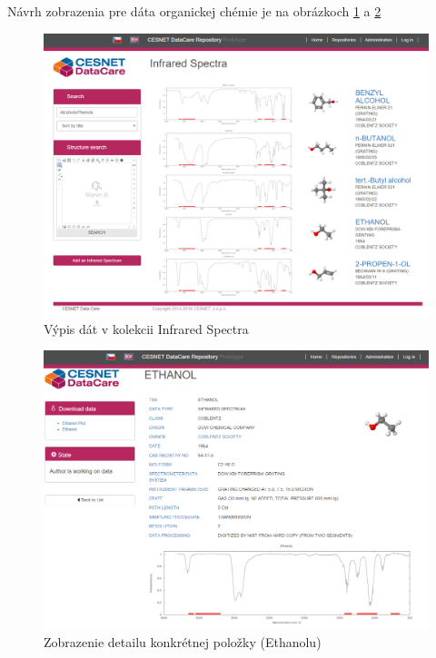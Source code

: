 \documentclass[thesis=M,slovak]{FITthesis}[2013/05/06]
\begin{document}
Návrh zobrazenia pre dáta organickej chémie je na obrázkoch \ref{graphics:listInfrared} a \ref{graphics:Ethanol}
\begin{figure}\centering
	\includegraphics[width=1.0\textwidth]{grafika/list_InfraredSpectra.png}
 	\caption[Výpis dát v kolekcii InfraredSpectra]{Výpis dát v kolekcii Infrared Spectra}\label{graphics:listInfrared}
\end{figure}

\begin{figure}\centering
	\includegraphics[width=1.0\textwidth]{grafika/detail_Ethanol.png}
 	\caption[Zobrazenie detailu konkrétnej položky (Ethanolu)]{Zobrazenie detailu konkrétnej položky (Ethanolu)}\label{graphics:Ethanol}
\end{figure}
\end{document}

